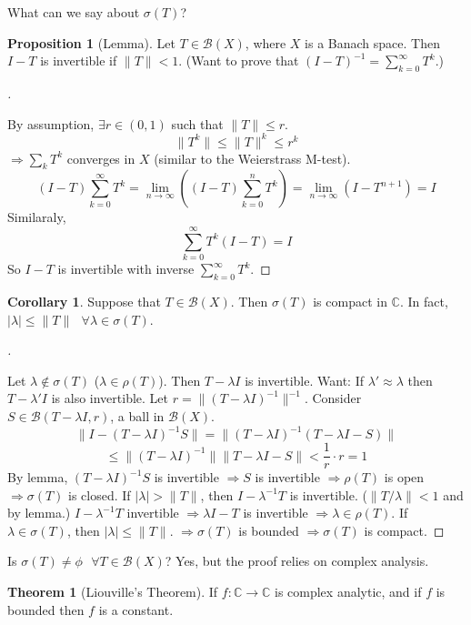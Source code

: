 \documentclass{article}
\newcommand{\sfa}{\text{  } \forall}
\theoremstyle{definition}
\newtheorem{thm}{Theorem}
\newtheorem{cor}{Corollary}
\newtheorem{prop}{Proposition}
\newenvironment{proofs}[1][\proofname]{%
  \begin{proof}[#1]$ $\par\nobreak\ignorespaces
}{%
  \end{proof}
}
\begin{document}
What can we say about $\sigma (T)$?

\begin{prop}[Lemma]
	Let $T \in \mathcal{B}(X)$, where $X$ is a Banach space.
	Then $I - T$ is invertible if $\|T\| < 1$.
	(Want to prove that $(I - T)^{-1} = \sum_{k = 0}^\infty T^k$.)
\end{prop}

\begin{proofs}
	By assumption, $\exists r \in (0, 1)$ such that $\|T\| \leq r$.
	\[
		\|T^k\| \leq \|T\|^k \leq r^k
	\]
	$\Rightarrow \sum_k T^k$ converges in $X$ (similar to the Weierstrass M-test).
	\[
		(I - T) \sum_{k = 0}^\infty T^k = \lim_{n \to \infty} \left( (I - T) \sum_{k = 0}^n T^k \right) = \lim_{n \to \infty} (I - T^{n + 1}) = I
	\]
	Similaraly, 
	\[
		\sum_{k = 0}^\infty T^k (I - T) = I
	\]
	So $I - T$ is invertible with inverse $\sum_{k = 0}^\infty T^k$.
\end{proofs}

\begin{cor}
	Suppose that $T \in \mathcal{B}(X)$.
	Then $\sigma(T)$ is compact in $\mathbb{C}$.
	In fact, $|\lambda| \leq \|T\| \sfa \lambda \in \sigma(T)$.
\end{cor}

\begin{proofs}
	Let $\lambda \notin \sigma(T)$ ($\lambda \in \rho(T)$).
	Then $T - \lambda I$ is invertible.
	Want: If $\lambda' \approx \lambda$ then $T - \lambda' I$ is also invertible.
	Let $r = \|(T - \lambda I)^{-1}\|^{-1}$.
	Consider $S \in \mathcal{B}(T - \lambda I, r)$, a ball in $\mathcal{B}(X)$.
	\[
		\|I - (T - \lambda I)^{-1} S\| = \|(T - \lambda I)^{-1}(T - \lambda I - S)\|
	\]
	\[
		\leq \|(T - \lambda I)^{-1}\| \|T - \lambda I - S\| < \frac{1}{r} \cdot r = 1
	\]
	By lemma, $(T - \lambda I)^{-1} S$ is invertible $\Rightarrow S$ is invertible $\Rightarrow \rho(T)$ is open $\Rightarrow \sigma(T)$ is closed.
	If $|\lambda| > \|T\|$, then $I - \lambda^{-1} T$ is invertible.
	($\|T/\lambda\| < 1$ and by lemma.)
	$I - \lambda^{-1}T$ invertible $\Rightarrow \lambda I - T$ is invertible $\Rightarrow \lambda \in \rho(T)$.
	If $\lambda \in \sigma(T)$, then $|\lambda| \leq \|T\|$.
	$\Rightarrow \sigma(T)$ is bounded $\Rightarrow \sigma(T)$ is compact.
\end{proofs}

Is $\sigma(T) \neq \phi \sfa T \in \mathcal{B}(X)$?
Yes, but the proof relies on complex analysis.

\begin{thm}[Liouville's Theorem]
	If $f: \mathbb{C} \to \mathbb{C}$ is complex analytic, and if $f$ is bounded then $f$ is a constant.
\end{thm}
\end{document}
